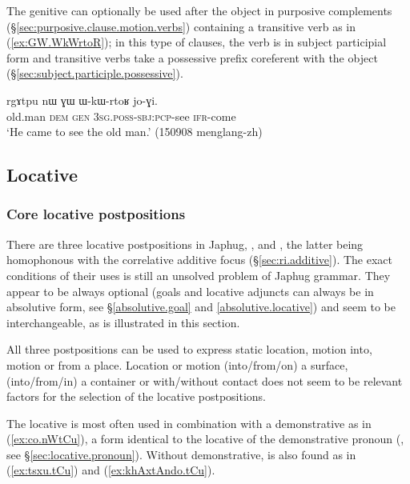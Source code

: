 The genitive  can optionally be used after the object in purposive complements (§\ref{sec:purposive.clause.motion.verbs}) containing a transitive verb as in (\ref{ex:GW.WkWrtoR}); in this type of clauses, the verb is in subject participial form and transitive verbs take a possessive prefix coreferent with the object (§\ref{sec:subject.participle.possessive}).

\begin{exe}
\ex \label{ex:GW.WkWrtoR}
\gll rgɤtpu nɯ ɣɯ ɯ-kɯ-rtoʁ jo-ɣi. \\
old.man \textsc{dem} \textsc{gen} \textsc{3sg}.\textsc{poss}-\textsc{sbj}:\textsc{pcp}-see \textsc{ifr}-come \\
\glt `He came to see the old man.' (150908 menglang-zh)
\end{exe}

\subsection{Locative} \label{sec:locative}

\subsubsection{Core locative postpositions} \label{sec:core.locative}
There are three locative postpositions in Japhug, ,  and , the latter being homophonous with the correlative additive focus  (§\ref{sec:ri.additive}). The exact conditions of their uses is still an unsolved problem of Japhug grammar. They appear to be always optional (goals and locative adjuncts can always be in absolutive form, see §\ref{absolutive.goal}  and \ref{absolutive.locative}) and seem to be interchangeable, as is illustrated in this section.

All three postpositions can be used to express static location, motion into, motion or from a place. Location or motion (into/from/on) a surface, (into/from/in) a container or with/without contact does not seem to be relevant factors for the selection of the locative postpositions.

The locative   is most often used in combination with a demonstrative  as in (\ref{ex:co.nWtCu}), a form identical to the locative of the demonstrative pronoun (, see §\ref{sec:locative.pronoun}). Without demonstrative,  is also found as in (\ref{ex:tsxu.tCu}) and (\ref{ex:khAxtAndo.tCu}).

